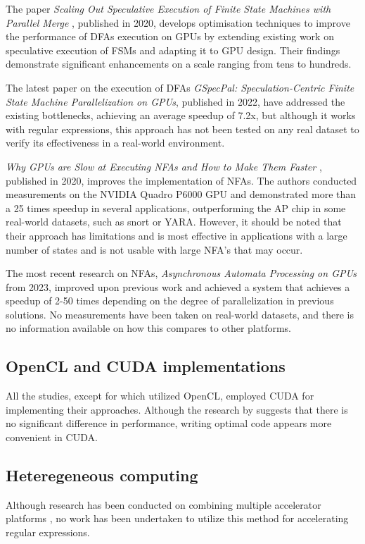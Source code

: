 \documentclass[10pt,onecolumn,twoside,english,a4paper]{article}
\begin{document}
The paper \textit{Scaling Out Speculative Execution of Finite State Machines with Parallel Merge} \cite{Xia:FSA-scaling}, published in 2020, develops optimisation techniques to improve the performance of DFAs execution on GPUs by extending existing work on speculative execution of FSMs and adapting it to GPU design. Their findings demonstrate significant enhancements on a scale ranging from tens to hundreds.

The latest paper on the execution of DFAs \textit{GSpecPal: Speculation-Centric Finite State Machine Parallelization on GPUs}\cite{wang2022gspecpal}, published in 2022, have addressed the existing bottlenecks, achieving an average speedup of 7.2x, but although it works with regular expressions, this approach has not been tested on any real dataset to verify its effectiveness in a real-world environment.

\textit{Why GPUs are Slow at Executing NFAs and How to Make Them Faster} \cite{Liu:WhyGPUSlowNFA}, published in 2020, improves the implementation of NFAs. The authors conducted measurements on the NVIDIA Quadro P6000 GPU and demonstrated more than a 25 times speedup in several applications, outperforming the AP chip in some real-world datasets, such as snort or YARA. However, it should be noted that their approach has limitations and is most effective in applications with a large number of states and is not usable with large NFA's that may occur.

The most recent research on NFAs, \textit{Asynchronous Automata Processing on GPUs}\cite{Liu:Asynchronous} from 2023, improved upon previous work and achieved a system that achieves a speedup of 2-50 times depending on the degree of parallelization in previous solutions. No measurements have been taken on real-world datasets, and there is no information available on how this compares to other platforms.

\subsection{OpenCL and CUDA implementations} \label{OpenCL and CUDA implementations}
All the studies, except for \cite{rosciszewski2014regular} which utilized OpenCL, employed CUDA for implementing their approaches. Although the research by \cite{Fang:Comparison-cuda-opencl} suggests that there is no significant difference in performance, writing optimal code appears more convenient in CUDA.

\subsection{Heteregeneous computing} \label{Heteregeneous computing}
Although research has been conducted on combining multiple accelerator platforms \cite{kobayashi2019gpu}, no work has been undertaken to utilize this method for accelerating regular expressions.
\end{document}
